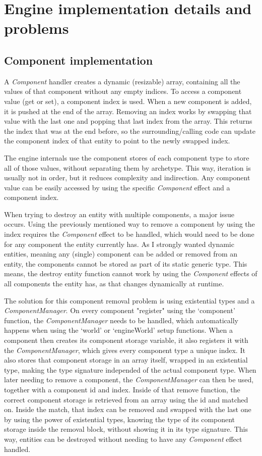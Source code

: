 \chapter{Engine implementation details and problems}\label{chap:details}

\section{Component implementation}

A \textit{Component} handler creates a dynamic (resizable) array, containing all the values of that component without any empty indices. To access a component value (get or set), a component index is used. When a new component is added, it is pushed at the end of the array. Removing an index works by swapping that value with the last one and popping that last index from the array. This returns the index that was at the end before, so the surrounding/calling code can update the component index of that entity to point to the newly swapped index.

The engine internals use the component stores of each component type to store all of those values, without separating them by archetype. This way, iteration is usually not in order, but it reduces complexity and indirection. Any component value can be easily accessed by using the specific \textit{Component} effect and a component index.

When trying to destroy an entity with multiple components, a major issue occurs. Using the previously mentioned way to remove a component by using the index requires the \textit{Component} effect to be handled, which would need to be done for any component the entity currently has. As I strongly wanted dynamic entities, meaning any (single) component can be added or removed from an entity, the components cannot be stored as part of its static generic type. This means, the destroy entity function cannot work by using the \textit{Component} effects of all components the entity has, as that changes dynamically at runtime.

The solution for this component removal problem is using existential types and a \textit{ComponentManager}. On every component "register" using the `component' function, the \textit{ComponentManager} needs to be handled, which automatically happens when using the `world' or `engineWorld' setup functions. When a component then creates its component storage variable, it also registers it with the \textit{ComponentManager}, which gives every component type a unique index. It also stores that component storage in an array itself, wrapped in an existential type, making the type signature independed of the actual component type. When later needing to remove a component, the \textit{ComponentManager} can then be used, together with a component id and index. Inside of that remove function, the correct component storage is retrieved from an array using the id and matched on. Inside the match, that index can be removed and swapped with the last one by using the power of existential types, knowing the type of its component storage inside the removal block, without showing it in its type signature. This way, entities can be destroyed without needing to have any \textit{Component} effect handled.
